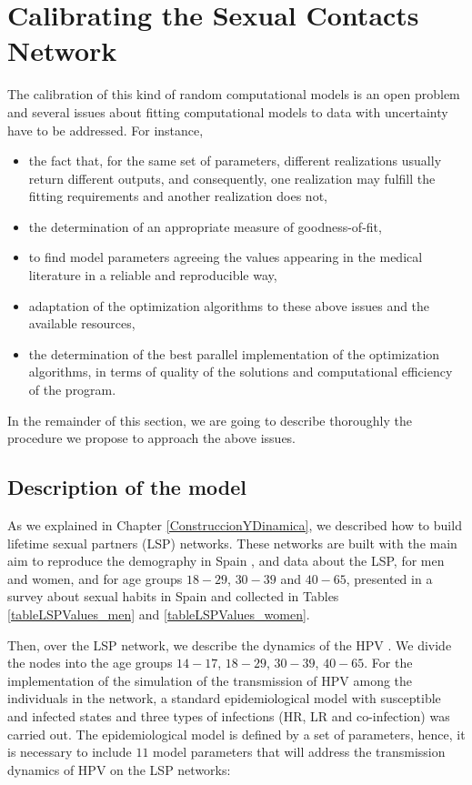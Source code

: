 \chapter{Calibrating the Sexual Contacts Network }\label{Calibrado}

The calibration of this kind of random computational models is an open problem and several issues about fitting computational models to data with uncertainty have to be addressed. For instance, 

\begin{itemize}
	\item the fact that, for the same set of parameters, different realizations usually return different outputs, and consequently, one realization may fulfill the fitting requirements and another realization does not,
	\item the determination of an appropriate measure of goodness-of-fit,
	\item to find model parameters agreeing the values appearing in the medical literature in a reliable and reproducible way,
	\item adaptation of the optimization algorithms to these above issues and the available resources,
	\item the determination of the best parallel implementation of the optimization algorithms, in terms of quality of the solutions and computational efficiency of the program.
\end{itemize} 

In the remainder of this section, we are going to describe thoroughly the procedure we propose to approach the above issues.

\section{Description of the model}\label{sec:modelo}
As we explained in Chapter \ref{ConstruccionYDinamica}, we described how to build lifetime sexual partners (LSP) networks. These networks are built with the main aim to reproduce the demography in Spain \cite{IVE}, and data about the LSP, for men and women, and for age groups $18-29$, $30-39$ and $40-65$, presented in a survey about sexual habits in Spain \cite{INE} and collected in Tables \ref{tableLSPValues_men} and \ref{tableLSPValues_women}. 

Then, over the LSP network, we describe the dynamics of the HPV \cite{Acedo2017,DezDomingo2017}. We divide the nodes into the age groups $14-17$, $18-29$, $30-39$, $40-65$. For the implementation of the simulation of the transmission of HPV among the individuals in the network, a standard epidemiological model with susceptible and infected states and three types of infections (HR, LR and co-infection) was carried out. The epidemiological model is defined by a set of parameters, hence, it is necessary to include $11$ model parameters that will address the transmission dynamics of HPV on the LSP networks:

